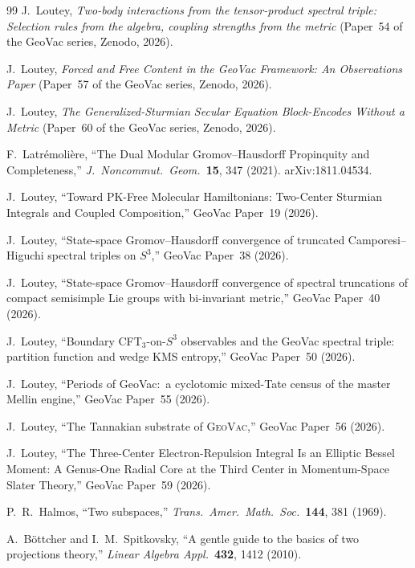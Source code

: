 \documentclass[11pt]{article}
\begin{document}
\begin{thebibliography}{99}
J.~Loutey, \emph{Two-body interactions from the tensor-product
spectral triple: Selection rules from the algebra, coupling strengths
from the metric} (Paper~54 of the GeoVac series, Zenodo, 2026).

J.~Loutey, \emph{Forced and Free Content in the GeoVac Framework:
An Observations Paper} (Paper~57 of the GeoVac series, Zenodo, 2026).

J.~Loutey, \emph{The Generalized-Sturmian Secular Equation Block-Encodes Without a
Metric} (Paper~60 of the GeoVac series, Zenodo, 2026).

F.~Latr\'emoli\`ere, ``The Dual Modular Gromov--Hausdorff Propinquity and Completeness,''
\textit{J.\ Noncommut.\ Geom.}\ \textbf{15}, 347 (2021).
arXiv:1811.04534.

J.~Loutey,
``Toward PK-Free Molecular Hamiltonians: Two-Center Sturmian Integrals and Coupled Composition,''
GeoVac Paper~19 (2026).

J.~Loutey,
``State-space Gromov--Hausdorff convergence of truncated Camporesi--Higuchi spectral triples on $S^3$,''
GeoVac Paper~38 (2026).

J.~Loutey,
``State-space Gromov--Hausdorff convergence of spectral truncations of compact semisimple Lie groups with bi-invariant metric,''
GeoVac Paper~40 (2026).

J.~Loutey,
``Boundary CFT$_{3}$-on-$S^3$ observables and the GeoVac spectral triple: partition function and wedge KMS entropy,''
GeoVac Paper~50 (2026).

J.~Loutey,
``Periods of GeoVac:\ a cyclotomic mixed-Tate census of the master Mellin engine,''
GeoVac Paper~55 (2026).

J.~Loutey,
``The Tannakian substrate of \textsc{GeoVac},''
GeoVac Paper~56 (2026).

J.~Loutey,
``The Three-Center Electron-Repulsion Integral Is an Elliptic Bessel Moment: A Genus-One Radial Core at the Third Center in Momentum-Space Slater Theory,''
GeoVac Paper~59 (2026).

P.~R.~Halmos,
``Two subspaces,''
\textit{Trans.\ Amer.\ Math.\ Soc.}\ \textbf{144}, 381 (1969).

A.~B\"ottcher and I.~M.~Spitkovsky,
``A gentle guide to the basics of two projections theory,''
\textit{Linear Algebra Appl.}\ \textbf{432}, 1412 (2010).


\end{thebibliography}
\end{document}
